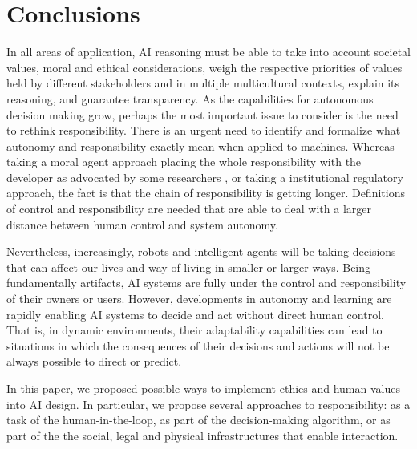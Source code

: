 \documentclass[twocolumn]{article}
\begin{document}
\section{Conclusions}\label{sec:conclusions}
In all areas of application, AI reasoning must be able to take into account societal values, moral and ethical considerations, weigh the respective priorities of values held by different stakeholders and in multiple multicultural contexts, explain its reasoning, and guarantee transparency. As the capabilities for autonomous decision making grow, perhaps the most important issue to consider is the need to rethink responsibility. %
There is an urgent need to identify and formalize what autonomy and responsibility exactly mean when applied to machines. Whereas taking a moral agent approach 
placing the whole responsibility with the developer as advocated by some researchers \cite{bryson2011just}, or taking a institutional regulatory approach, the fact is that the chain of responsibility is getting longer. Definitions of control and responsibility are needed that are able to deal with a larger distance between human control and system autonomy.

Nevertheless, increasingly, robots and intelligent agents will be taking decisions that can affect our lives and way of living in smaller or larger ways. Being fundamentally artifacts, AI systems are fully under the control and responsibility of their owners  or users. However,  developments in autonomy and learning are rapidly enabling AI systems to decide and act without direct human control. That is,
in dynamic environments, their adaptability capabilities can lead to situations in which the consequences of their decisions and actions will not be always possible to direct or predict.


In this paper, we proposed possible ways to implement ethics and human values into AI design. In particular, we propose several approaches to responsibility: as a task of the human-in-the-loop, as part of the decision-making algorithm, or as part of the the social, legal and physical infrastructures that enable interaction. 



\clearpage \newpage



\end{document}
